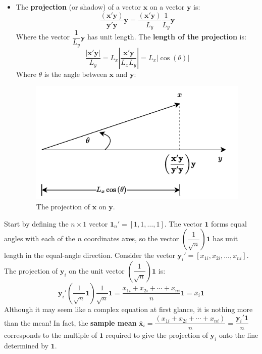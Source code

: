 \documentclass[a4paper]{article}
\newcommand{\definition}[1]{\textcolor{Red3}{\textbf{#1}}\index{#1}}
\begin{document}
\begin{itemize}
        \item The \definition{projection} (or shadow) of a vector $\mathbf{x}$ on a vector $\mathbf{y}$ is:
        \begin{equation}\label{eq: projection}
            \dfrac{\left(\mathbf{x}'\mathbf{y}\right)}{\mathbf{y}'\mathbf{y}}\mathbf{y} = \dfrac{\left(\mathbf{x}'\mathbf{y}\right)}{L_{y}}\dfrac{1}{L_{y}}\mathbf{y}
        \end{equation}
        Where the vector $\dfrac{1}{L_{y}}\mathbf{y}$ has unit length. The \textbf{length of the projection} is:
        \begin{equation}\label{eq: length of the projection}
            \dfrac{\left| \mathbf{x}'\mathbf{y} \right|}{L_{y}} = L_{x} \left| \dfrac{\mathbf{x}'\mathbf{y}}{L_{x}L_{y}} \right| = L_{x} \left| \cos\left(\theta\right) \right|
        \end{equation}
        Where $\theta$ is the angle between $\mathbf{x}$ and $\mathbf{y}$:
        \begin{figure}[!htp]
            \centering
            \includegraphics[width=.7\textwidth]{img/basics-vector-algebra-2.pdf}
            \caption{The projection of $\mathbf{x}$ on $\mathbf{y}$.}
        \end{figure}
    \end{itemize}
    Start by defining the $n \times 1$ vector $\mathbf{1}_{n}' = \left[1, 1, \dots, 1\right]$. The vector $\mathbf{1}$ forms equal angles with each of the $n$ coordinates axes, so the vector $\left(\dfrac{1}{\sqrt{n}}\right)\mathbf{1}$ has unit length in the equal-angle direction. Consider the vector $\mathbf{y}_{i}' = \left[x_{1i}, x_{2i}, \dots, x_{ni}\right]$. The projection of $\mathbf{y}_{i}$ on the unit vector $\left(\dfrac{1}{\sqrt{n}}\right)\mathbf{1}$ is:
    \begin{equation}\label{eq: sample mean - geometrical representation}
        \mathbf{y}_{i}'\left(\dfrac{1}{\sqrt{n}}\mathbf{1}\right)\dfrac{1}{\sqrt{n}}\mathbf{1} = 
        \dfrac{x_{1i} + x_{2i} + \cdots + x_{ni}}{n}\mathbf{1} = \overline{x}_{i}\mathbf{1}
    \end{equation}
    Although it may seem like a complex equation at first glance, it is nothing more than the mean! In fact, the \textbf{sample mean} $\overline{\mathbf{x}}_{i} = \dfrac{\left(x_{1i} + x_{2i} + \cdots + x_{ni}\right)}{n} = \dfrac{\mathbf{y}_{i}' \mathbf{1}}{n}$ corresponds to the multiple of $\mathbf{1}$ required to give the projection of $\mathbf{y}_{i}$ onto the line determined by $\mathbf{1}$.\newpage
\end{document}
